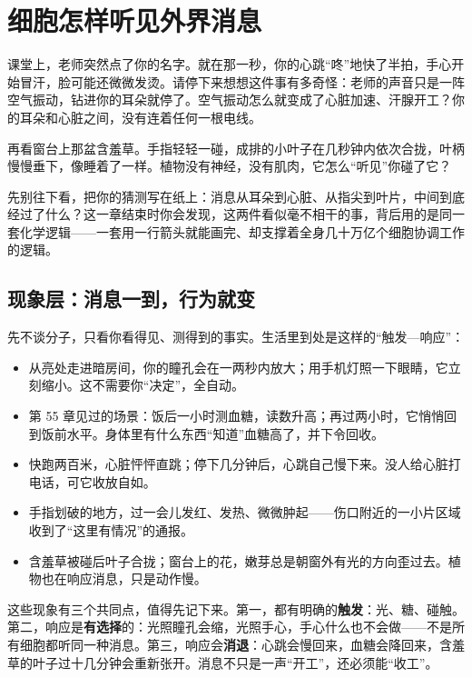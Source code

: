 \chapter{细胞怎样听见外界消息}

\begin{kaichang}
课堂上，老师突然点了你的名字。就在那一秒，你的心跳“咚”地快了半拍，手心开始冒汗，脸可能还微微发烫。请停下来想想这件事有多奇怪：老师的声音只是一阵空气振动，钻进你的耳朵就停了。空气振动怎么就变成了心脏加速、汗腺开工？你的耳朵和心脏之间，没有连着任何一根电线。

再看窗台上那盆含羞草。手指轻轻一碰，成排的小叶子在几秒钟内依次合拢，叶柄慢慢垂下，像睡着了一样。植物没有神经，没有肌肉，它怎么“听见”你碰了它？

先别往下看，把你的猜测写在纸上：消息从耳朵到心脏、从指尖到叶片，中间到底经过了什么？这一章结束时你会发现，这两件看似毫不相干的事，背后用的是同一套化学逻辑——一套用一行箭头就能画完、却支撑着全身几十万亿个细胞协调工作的逻辑。
\end{kaichang}

\section{现象层：消息一到，行为就变}

先不谈分子，只看你看得见、测得到的事实。生活里到处是这样的“触发—响应”：

\begin{itemize}[itemsep=2pt]
\item 从亮处走进暗房间，你的瞳孔会在一两秒内放大；用手机灯照一下眼睛，它立刻缩小。这不需要你“决定”，全自动。
\item 第 55 章见过的场景：饭后一小时测血糖，读数升高；再过两小时，它悄悄回到饭前水平。身体里有什么东西“知道”血糖高了，并下令回收。
\item 快跑两百米，心脏怦怦直跳；停下几分钟后，心跳自己慢下来。没人给心脏打电话，可它收放自如。
\item 手指划破的地方，过一会儿发红、发热、微微肿起——伤口附近的一小片区域收到了“这里有情况”的通报。
\item 含羞草被碰后叶子合拢；窗台上的花，嫩芽总是朝窗外有光的方向歪过去。植物也在响应消息，只是动作慢。
\end{itemize}

这些现象有三个共同点，值得先记下来。第一，都有明确的\textbf{触发}：光、糖、碰触。第二，响应是\textbf{有选择}的：光照瞳孔会缩，光照手心，手心什么也不会做——不是所有细胞都听同一种消息。第三，响应会\textbf{消退}：心跳会慢回来，血糖会降回来，含羞草的叶子过十几分钟会重新张开。消息不只是一声“开工”，还必须能“收工”。

